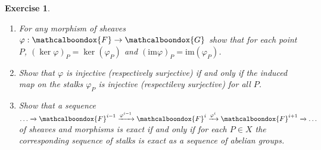\documentclass[12pt]{article}
\newcommand{\ima}{\ensuremath{\mathrm{im}}}
\newtheorem{ex}{Exercise}[section]
\theoremstyle{definition}
\newcommand{\sF}{\ensuremath{\mathcalboondox{F}}}
\newcommand{\sG}{\ensuremath{\mathcalboondox{G}}}
\begin{document}
\begin{ex}
	\begin{enumerate}[label=\alph*)]
		\item For any morphism of sheaves $\varphi: \sF \to \sG$ show that for each point $P$, $(\ker \varphi)_P = \ker(\varphi_P)$ and $(\ima \varphi)_P = \ima (\varphi_P)$.
		\item Show that $\varphi$ is injective (respectively surjective) if and only if the induced map on the stalks $\varphi_P$ is injective (respectilevy surjective) for all $P$.
		\item Show that a sequence $\dots \xrightarrow[]{} \sF^{i-1} \xrightarrow[]{\varphi^{i-1}} \sF^{i} \xrightarrow[]{\varphi^{i}} \sF^{i+1} \xrightarrow[]{} \dots$ of sheaves and morphisms is exact if and only if for each $P \in X$ the corresponding sequence of stalks is exact as a sequence of abelian groups.
	\end{enumerate}
\end{ex}
\end{document}
